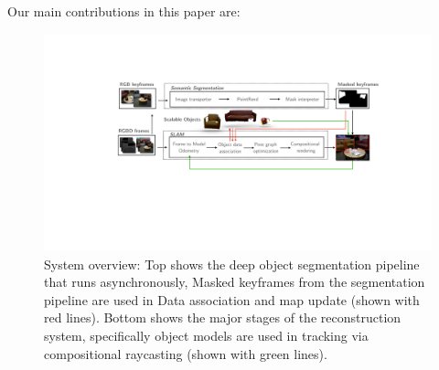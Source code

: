Our main contributions in this paper are:



 \begin{figure}[ht!]
 	\centering
    \includegraphics[width=0.90\linewidth]{figs/icra2021-compressed.pdf}
    \caption{\label{fig:overview} System overview: Top shows the deep object segmentation pipeline that runs asynchronously, Masked keyframes from the segmentation pipeline are used in Data association and map update (shown with red lines). Bottom shows the major stages of the reconstruction system, specifically object models are used in tracking via compositional raycasting (shown with green lines).}
    \vspace*{-1em}
 \end{figure}



